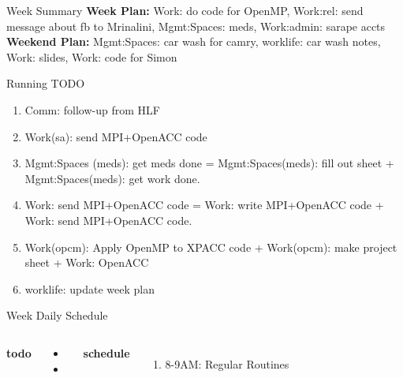 \begin{frame}
\begin{columns}
    \begin{column}{0.50\linewidth}
      \begin{block}{Week Summary}
        {\tiny \textbf{Week Plan:} Work: do code for OpenMP, Work:rel: 
          send message about fb to Mrinalini, Mgmt:Spaces: meds,
          Work:admin: sarape accts }
        {\tiny \textbf{Weekend Plan:} Mgmt:Spaces: car wash for camry,
        worklife: car wash notes, Work: slides, Work: code for Simon } 
      \end{block}
      \begin{block}{Running TODO} %
        \begin{enumerate}
        \item \small Comm: follow-up from HLF

      \small \item \small Work(sa): send MPI+OpenACC code


      \small \item \small Mgmt:Spaces (meds): get meds done = 
      Mgmt:Spaces(meds): fill out sheet + Mgmt:Spaces(meds): get work
      done. 

      \small \item \small Work: send MPI+OpenACC code = Work: write MPI+OpenACC code + Work: send MPI+OpenACC code. 
    \item \small  Work(opcm): Apply OpenMP to XPACC code 
      +  Work(opcm): make project sheet +  Work: OpenACC 

    \item \small worklife: update week plan 
        \end{enumerate}
      \end{block} 

      \begin{block}{Week Daily Schedule} 
        \begin{columns} 
          \textbf{\small todo} \\ 
          \begin{itemize}
            \tiny \item \tiny 
          \item \tiny 
          \end{itemize} 
          \textbf{\small schedule} \\
          \begin{enumerate} 
            \tiny \item \tiny 8-9AM: Regular Routines 
          \end{enumerate} 
          

\end{columns}
\end{block}
\end{column}
\end{columns}
\end{frame}
